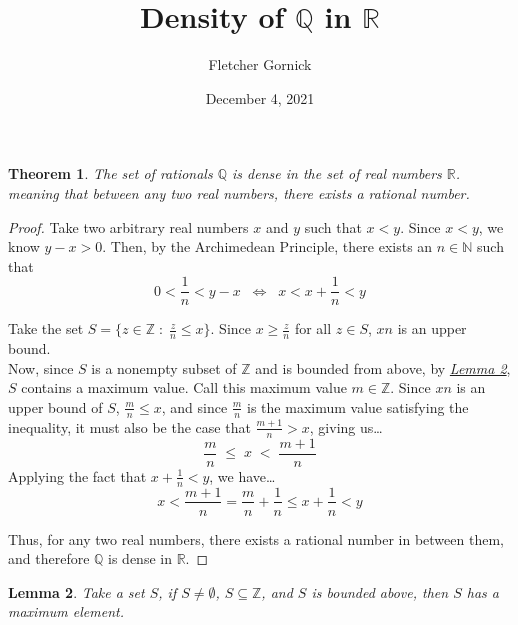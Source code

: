 \documentclass[11pt]{article}
\title{Density of $\mathbb{Q}$ in $\mathbb{R}$}
\author{Fletcher Gornick}
\date{December 4, 2021}
\newtheorem{theorem}{Theorem}
\newtheorem{lemma}[theorem]{Lemma}
\begin{document}
\maketitle
\begin{theorem}
  The set of rationals $\mathbb{Q}$ is dense in the set of real numbers $\mathbb{R}$. 
  meaning that between any two real numbers, there exists a rational number.
\end{theorem}

\begin{proof}
  Take two arbitrary real numbers $x$ and $y$ such that $x<y$. Since $x<y$, 
  we know $y-x>0$.  Then, by the Archimedean Principle, there exists an $n \in \mathbb{N}$ 
  such that $$0 < \frac{1}{n} < y-x \;\;\Leftrightarrow\;\; x < x + \frac{1}{n} < y$$
  
  Take the set $S = \{z \in \mathbb{Z} \;:\; \frac{z}{n} \leq x\}$. Since 
  $x \geq \frac{z}{n}$ for all $z \in S$, $xn$ is an upper bound. \\

  Now, since $S$ is a nonempty subset of $\mathbb{Z}$ and is bounded from above, 
  by \textit{\hyperref[L]{Lemma 2}}, $S$ contains a maximum value.  Call this 
  maximum value $m \in \mathbb{Z}$.  Since $xn$ is an upper bound of $S$,
  $\frac{m}{n} \leq x$, and since $\frac{m}{n}$ is the maximum value satisfying the 
  inequality, it must also be the case that $\frac{m+1}{n} > x$, giving us\dots
  $$\frac{m}{n} \;\leq\; x \;<\; \frac{m+1}{n}$$
  Applying the fact that $x + \frac{1}{n} < y$, we have\dots
  $$x < \frac{m+1}{n} = \frac{m}{n} + \frac{1}{n} \leq x + \frac{1}{n} < y$$

  Thus, for any two real numbers, there exists a rational number 
  in between them, and therefore $\mathbb{Q}$ is dense in $\mathbb{R}$.

\end{proof}
\newpage

\begin{lemma}\label{L}
  Take a set $S$, if $S \neq \emptyset$, $S \subseteq \mathbb{Z}$, and $S$ is bounded above, then 
  $S$ has a maximum element.
\end{lemma}
\end{document}
